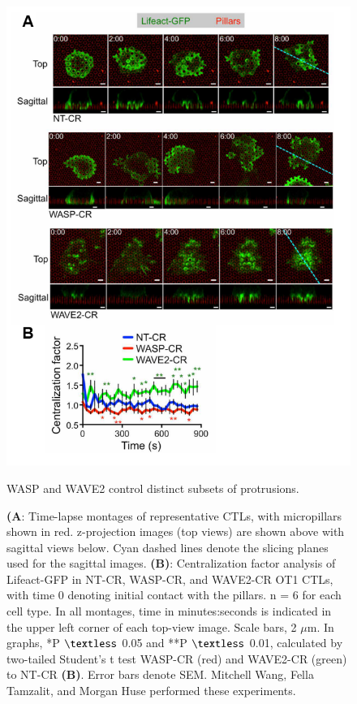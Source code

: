 \begin{figure}[htbp]
	\centering
	\includegraphics[width=\textwidth]{../figures/chapter2/fig5flcrisprs.png}
	\caption{WASP and WAVE2 control distinct subsets of protrusions.}
	\caption*{\textbf{(A}: Time-lapse montages of representative CTLs, with micropillars shown in red. z-projection images (top views) are shown above with sagittal views below. Cyan dashed lines denote the slicing planes used for the sagittal images. \textbf{(B)}: Centralization factor analysis of Lifeact-GFP in NT-CR, WASP-CR, and WAVE2-CR OT1 CTLs, with time 0 denoting initial contact with the pillars. n = 6 for each cell type. In all montages, time in minutes:seconds is indicated in the upper left corner of each top-view image. Scale bars, 2 $\mu$m. In graphs, *P $\textless$ 0.05 and **P $\textless$ 0.01, calculated by two-tailed Student’s t test  WASP-CR (red) and WAVE2-CR (green) to NT-CR \textbf{(B)}. Error bars denote SEM. Mitchell Wang, Fella Tamzalit, and Morgan Huse performed these experiments.}
	\label{fig:fig5flcrisprs}
\end{figure}


